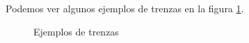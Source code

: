 \documentclass[14pt]{extarticle}
\begin{document}
Podemos ver algunos ejemplos de trenzas en la figura \ref{tren1}.\\
   \begin{figure}[h!]
   	\centering
   	\space
   	\caption{Ejemplos de trenzas}
   	\label{tren1} 
   \end{figure} 
\end{document}
